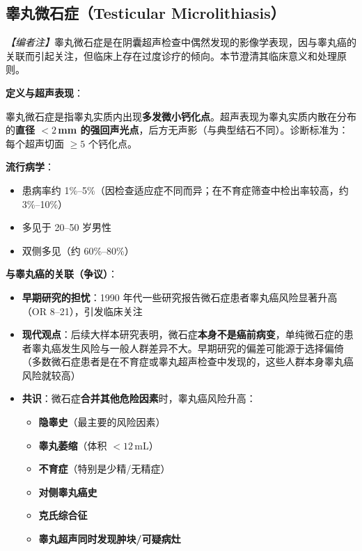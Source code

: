 \documentclass[12pt,a4paper,twoside]{ctexbook}
\begin{document}
\subsection{睾丸微石症（Testicular Microlithiasis）}
\label{subsec:microlithiasis}

\noindent\textit{【编者注】}睾丸微石症是在阴囊超声检查中偶然发现的影像学表现，因与睾丸癌的关联而引起关注，但临床上存在过度诊疗的倾向。本节澄清其临床意义和处理原则。

\vspace{0.5em}
\noindent\textbf{定义与超声表现}：

睾丸微石症是指睾丸实质内出现\textbf{多发微小钙化点}。超声表现为睾丸实质内散在分布的\textbf{直径 $<2\,$mm 的强回声光点}，后方无声影（与典型结石不同）。诊断标准为：每个超声切面 $\geq 5$ 个钙化点。

\vspace{0.5em}
\noindent\textbf{流行病学}：
\begin{itemize}[leftmargin=2cm]
	\item 患病率约 1\%--5\%（因检查适应症不同而异；在不育症筛查中检出率较高，约 3\%--10\%）
	\item 多见于 20--50 岁男性
	\item 双侧多见（约 60\%--80\%）
\end{itemize}

\vspace{0.5em}
\noindent\textbf{与睾丸癌的关联（争议）}：

\begin{itemize}[leftmargin=2cm]
	\item \textbf{早期研究的担忧}：1990 年代一些研究报告微石症患者睾丸癌风险显著升高（OR 8--21），引发临床关注
	\item \textbf{现代观点}：后续大样本研究表明，微石症\textbf{本身不是癌前病变}，单纯微石症的患者睾丸癌发生风险与一般人群差异不大。早期研究的偏差可能源于选择偏倚（多数微石症患者是在不育症或睾丸超声检查中发现的，这些人群本身睾丸癌风险就较高）
	\item \textbf{共识}：微石症\textbf{合并其他危险因素}时，睾丸癌风险升高：
	\begin{itemize}
		\item \textbf{隐睾史}（最主要的风险因素）
		\item \textbf{睾丸萎缩}（体积 $<12\,$mL）
		\item \textbf{不育症}（特别是少精/无精症）
		\item \textbf{对侧睾丸癌史}
		\item \textbf{克氏综合征}
		\item \textbf{睾丸超声同时发现肿块/可疑病灶}
	\end{itemize}
\end{itemize}
\end{document}
